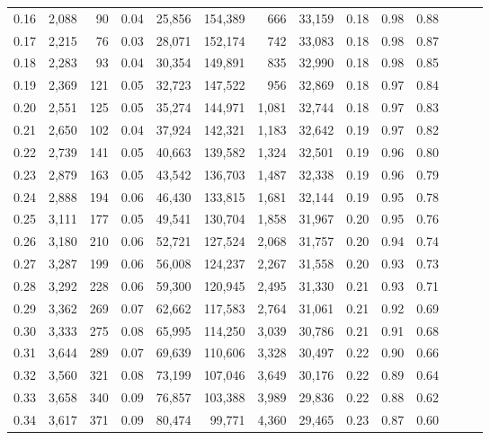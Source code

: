 \begin{tabular}{rrrrrrrrrrrrrr}
0.16 &  2,088 &   90 &  0.04 &   25,856 &  154,389 &     666 &  33,159 &  0.18 &  0.98 &      0.88 \\
0.17 &  2,215 &   76 &  0.03 &   28,071 &  152,174 &     742 &  33,083 &  0.18 &  0.98 &      0.87 \\
0.18 &  2,283 &   93 &  0.04 &   30,354 &  149,891 &     835 &  32,990 &  0.18 &  0.98 &      0.85 \\
0.19 &  2,369 &  121 &  0.05 &   32,723 &  147,522 &     956 &  32,869 &  0.18 &  0.97 &      0.84 \\
0.20 &  2,551 &  125 &  0.05 &   35,274 &  144,971 &   1,081 &  32,744 &  0.18 &  0.97 &      0.83 \\
0.21 &  2,650 &  102 &  0.04 &   37,924 &  142,321 &   1,183 &  32,642 &  0.19 &  0.97 &      0.82 \\
0.22 &  2,739 &  141 &  0.05 &   40,663 &  139,582 &   1,324 &  32,501 &  0.19 &  0.96 &      0.80 \\
0.23 &  2,879 &  163 &  0.05 &   43,542 &  136,703 &   1,487 &  32,338 &  0.19 &  0.96 &      0.79 \\
0.24 &  2,888 &  194 &  0.06 &   46,430 &  133,815 &   1,681 &  32,144 &  0.19 &  0.95 &      0.78 \\
0.25 &  3,111 &  177 &  0.05 &   49,541 &  130,704 &   1,858 &  31,967 &  0.20 &  0.95 &      0.76 \\
0.26 &  3,180 &  210 &  0.06 &   52,721 &  127,524 &   2,068 &  31,757 &  0.20 &  0.94 &      0.74 \\
0.27 &  3,287 &  199 &  0.06 &   56,008 &  124,237 &   2,267 &  31,558 &  0.20 &  0.93 &      0.73 \\
0.28 &  3,292 &  228 &  0.06 &   59,300 &  120,945 &   2,495 &  31,330 &  0.21 &  0.93 &      0.71 \\
0.29 &  3,362 &  269 &  0.07 &   62,662 &  117,583 &   2,764 &  31,061 &  0.21 &  0.92 &      0.69 \\
0.30 &  3,333 &  275 &  0.08 &   65,995 &  114,250 &   3,039 &  30,786 &  0.21 &  0.91 &      0.68 \\
0.31 &  3,644 &  289 &  0.07 &   69,639 &  110,606 &   3,328 &  30,497 &  0.22 &  0.90 &      0.66 \\
0.32 &  3,560 &  321 &  0.08 &   73,199 &  107,046 &   3,649 &  30,176 &  0.22 &  0.89 &      0.64 \\
0.33 &  3,658 &  340 &  0.09 &   76,857 &  103,388 &   3,989 &  29,836 &  0.22 &  0.88 &      0.62 \\
0.34 &  3,617 &  371 &  0.09 &   80,474 &   99,771 &   4,360 &  29,465 &  0.23 &  0.87 &      0.60 \\

\end{tabular}
